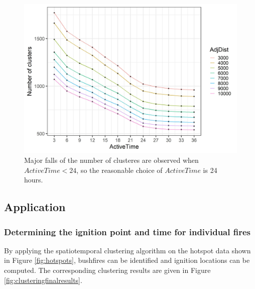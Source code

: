 \begin{Schunk}
\begin{figure}

{\centering \includegraphics[width=0.8\linewidth]{figures/clustering_tuning_2} 

}

\caption[Major falls of the number of clusteres are observed when $ActiveTime < 24$, so the reasonable choice of $ActiveTime$ is 24 hours]{Major falls of the number of clusteres are observed when $ActiveTime < 24$, so the reasonable choice of $ActiveTime$ is 24 hours.}\label{fig:vis2}
\end{figure}
\end{Schunk}

\hypertarget{application}{%
\subsection{Application}\label{application}}

\hypertarget{determining-the-ignition-point-and-time-for-individual-fires}{%
\subsubsection{Determining the ignition point and time for individual
fires}\label{determining-the-ignition-point-and-time-for-individual-fires}}

By applying the spatiotemporal clustering algorithm on the hotspot data
shown in Figure \ref{fig:hotspots}, bushfires can be identified and
ignition locations can be computed. The corresponding clustering results
are given in Figure \ref{fig:clusteringfinalresults}.

